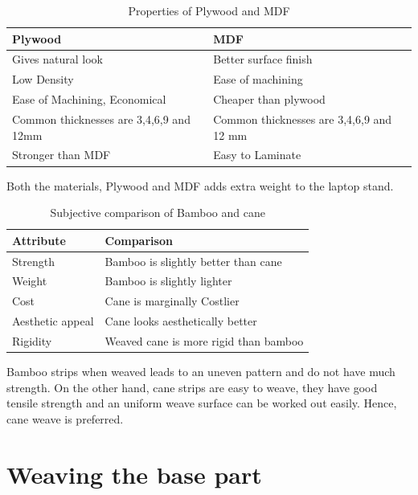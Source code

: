 \begin{table}[h!]
  \centering
  \caption{Properties of Plywood and MDF}
  \label{tab:table4}
  \begin{tabular}{l||l}
  	\hline
  	Plywood & MDF\\
    \hline
	Gives natural look   & Better surface finish\\
	Low Density & Ease of machining\\
	Ease of Machining, Economical & Cheaper than plywood\\
	Common thicknesses are 3,4,6,9 and 12mm & Common thicknesses are 3,4,6,9 and 12 mm\\
	Stronger than MDF & Easy to Laminate\\
  \end{tabular}
\end{table}

Both the materials, Plywood and MDF adds extra weight to the laptop stand.

\begin{table}[h!]
  \centering
  \caption{Subjective comparison of Bamboo and cane}
  \label{tab:table5}
  \begin{tabular}{l||l}
  	\hline
  	Attribute & Comparison\\
    \hline    
	Strength & Bamboo is slightly better than cane\\
	Weight & Bamboo is slightly lighter \\
	Cost & Cane is marginally Costlier\\
	Aesthetic appeal & Cane looks aesthetically better\\
	Rigidity & Weaved cane is more rigid than bamboo\\

  \end{tabular}
\end{table}

Bamboo strips when weaved leads to an uneven pattern and do not have much strength. On the other hand, cane strips are easy to weave, they have good tensile strength and an uniform weave surface can be worked out easily. Hence, cane weave is preferred.

\section{Weaving the base part}

